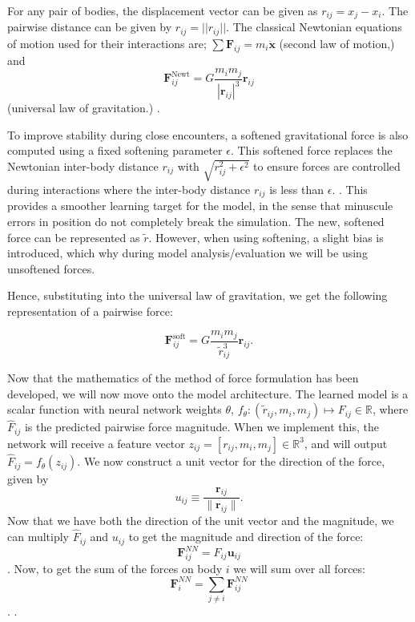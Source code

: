 \documentclass[12pt]{article}
\begin{document}
For any pair of bodies, the displacement vector can be given as $r_{ij} = x_j - x_i$. The pairwise distance can be given by $r_{ij} = ||r_{ij}||$. The classical Newtonian equations of motion used for their interactions are; $\sum \mathbf{F}_{ij} = m_i \mathbf{\ddot x}$ (second law of motion,) and $$\mathbf{F}_{ij}^{\text{Newt}} = G \frac{m_i m_j}{|\mathbf{r}_{ij}|^3} \mathbf{r}_{ij}$$ (universal law of gravitation.) \cite{murray1999solar}.

To improve stability during close encounters, a softened gravitational force is also computed using a fixed softening parameter $\epsilon$. This softened force replaces the Newtonian inter-body distance $r_{ij}$ with $\sqrt{r^2_{ij} + \epsilon^2}$ to ensure forces are controlled during interactions where the inter-body distance $r_{ij}$ is less than $\epsilon$. \cite{Dehnen2001}. This provides a smoother learning target for the model, in the sense that minuscule errors in position do not completely break the simulation. The new, softened force can be represented as $\tilde{r}$. However, when using softening, a slight bias is introduced, which why during model analysis/evaluation we will be using unsoftened forces.

Hence, substituting into the universal law of gravitation, we get the following representation of a pairwise force:

$$\mathbf{F}_{ij}^{\text{soft}} = G \frac{m_i m_j}{\tilde{r}_{ij}^3} \mathbf{r}_{ij}.$$

Now that the mathematics of the method of force formulation has been developed, we will now move onto the model architecture. The learned model is a scalar function with neural network weights $\theta$, $f_{\theta} : (\tilde{r}_{ij}, m_i, m_j) \mapsto F_{ij} \in \mathbb{R}$, where $\hat{F}_{ij}$ is the predicted pairwise force magnitude. When we implement this, the network will receive a feature vector $z_{ij} = [r_{ij}, m_i, m_j] \in \mathbb{R}^3$, and will output $\hat{F}_{ij} = f_{\theta}(z_{ij})$.
We now construct a unit vector for the direction of the force, given by
$$u_{ij} \equiv \frac{\mathbf{r}_{ij}}{\|\mathbf{r}_{ij}\|}.$$
Now that we have both the direction of the unit vector and the magnitude, we can multiply $\hat{F}_{ij}$ and $u_{ij}$ to get the magnitude and direction of the force: $$\mathbf{F}_{ij}^{NN} = F_{ij} \mathbf{u}_{ij}$$. Now, to get the sum of the forces on body $i$ we will sum over all forces: $$\mathbf{F}_{i}^{NN} = \sum_{j \neq i} \mathbf{F}_{ij}^{NN}$$. \cite{kipf2018neural}.
\end{document}
